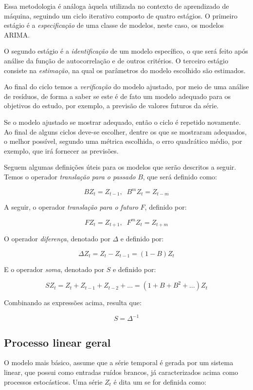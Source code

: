Essa metodologia é análoga àquela utilizada no contexto de aprendizado de máquina, seguindo um ciclo iterativo composto de quatro estágios. O primeiro estágio é a \emph{especificação} de uma classe de modelos, neste caso, os modelos ARIMA.

O segundo estágio é a \emph{identificação} de um modelo específico, o  que será feito após análise da função de autocorrelação e de outros critérios. O terceiro estágio consiste na \emph{estimação}, na qual os parâmetros do modelo escolhido são estimados.

Ao final do ciclo temos a \emph{verificação} do modelo ajustado, por meio de uma análise de resíduos, de forma a saber se este é de fato um modelo adequado para os objetivos do estudo, por exemplo, a previsão de valores futuros da série.

Se o modelo ajustado se mostrar adequado, então o ciclo é repetido novamente. Ao final de alguns ciclos deve-se escolher, dentre os que se mostraram adequados, o melhor possível, segundo uma métrica escolhida, o erro quadrático médio, por exemplo, que irá fornecer as previsões.

Seguem algumas definições úteis para os modelos que serão descritos a seguir. Temos o operador \emph{translação para o passado} $B$, que será definido como:

\[ B Z_t = Z_{t-1} ,\;\; B^m Z_t = Z_{t-m} \]

A seguir, o operador \emph{translação para o futuro} $F$, definido por:

\[ F Z_t = Z_{t+1} ,\;\; F^m Z_t = Z_{t+m}  \]

O operador \emph{diferença}, denotado por $\Delta$ e definido por:

\[ \Delta Z_t = Z_t - Z_{t-1} = (1 - B)Z_t \]

E o operador \emph{soma}, denotado por $S$ e definido por:

\[ S Z_t = Z_t + Z_{t-1} + Z_{t-2} + \ldots = (1 + B + B^2 + \ldots)Z_t \]

Combinando as expressões acima, resulta que:

\[ S = \Delta^{-1} \]

\subsection{Processo linear geral}

O modelo mais básico, assume que a série temporal é gerada por um sistema linear, que possui como entradas ruídos brancos, já caracterizados acima como processos estocásticos. Uma série $Z_t$ é dita um  se for definida como:

